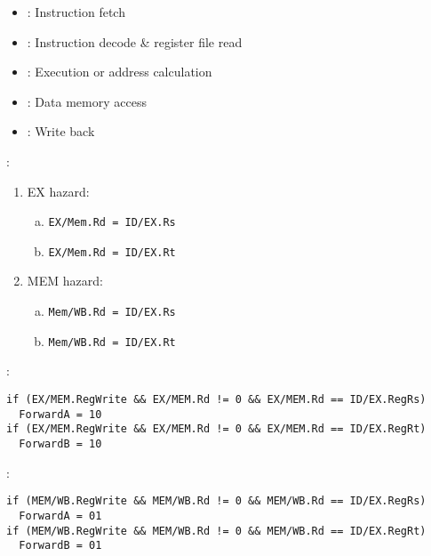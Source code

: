 \begin{multicols}{2}
    \begin{itemize}
      \item {}: Instruction fetch
      \item {}: Instruction decode \& register file read
      \item {}: Execution or address calculation
      \item {}: Data memory access
      \item {}: Write back
    \end{itemize}

      \par {}:
\begin{multicols}{2}
      \begin{enumerate}[1.]
        \item EX hazard:
          \begin{enumerate}[a.]
            \item \lstinline{EX/Mem.Rd = ID/EX.Rs}
            \item \lstinline{EX/Mem.Rd = ID/EX.Rt}
          \end{enumerate}
        \item MEM hazard:
          \begin{enumerate}[a.]
            \item \lstinline{Mem/WB.Rd = ID/EX.Rs}
            \item \lstinline{Mem/WB.Rd = ID/EX.Rt}
          \end{enumerate}
      \end{enumerate}
\end{multicols}
      \par {}:
\begin{lstlisting}
if (EX/MEM.RegWrite && EX/MEM.Rd != 0 && EX/MEM.Rd == ID/EX.RegRs)
  ForwardA = 10
if (EX/MEM.RegWrite && EX/MEM.Rd != 0 && EX/MEM.Rd == ID/EX.RegRt)
  ForwardB = 10
\end{lstlisting}
      \par {}:
\begin{lstlisting}
if (MEM/WB.RegWrite && MEM/WB.Rd != 0 && MEM/WB.Rd == ID/EX.RegRs)
  ForwardA = 01
if (MEM/WB.RegWrite && MEM/WB.Rd != 0 && MEM/WB.Rd == ID/EX.RegRt)
  ForwardB = 01
\end{lstlisting}


\end{multicols}
